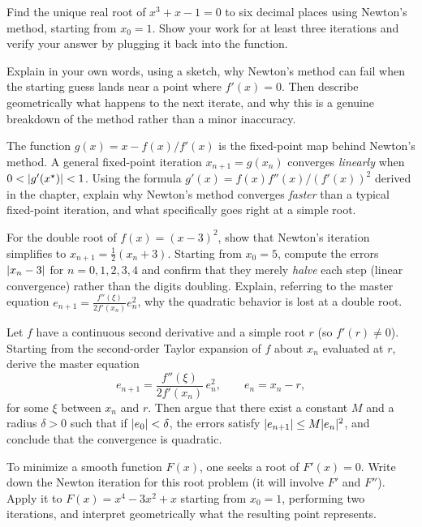 \begin{exercise}
Find the unique real root of $x^3 + x - 1 = 0$ to six decimal places using Newton's
method, starting from $x_0 = 1$. Show your work for at least three iterations and
verify your answer by plugging it back into the function.
\end{exercise}

\begin{exercise}[Conceptual]
Explain in your own words, using a sketch, why Newton's method can fail when the
starting guess lands near a point where $f'(x) = 0$. Then describe geometrically what
happens to the next iterate, and why this is a genuine breakdown of the method rather
than a minor inaccuracy.
\end{exercise}

\begin{exercise}[Conceptual]
The function $g(x) = x - f(x)/f'(x)$ is the fixed-point map behind Newton's method. A
general fixed-point iteration $x_{n+1} = g(x_n)$ converges \emph{linearly} when
$0 < \lvert g'(x^\star)\rvert < 1$. Using the formula $g'(x) = f(x)f''(x)/(f'(x))^2$ derived
in the chapter, explain why Newton's method converges \emph{faster} than a typical
fixed-point iteration, and what specifically goes right at a simple root.
\end{exercise}

\begin{exercise}
For the double root of $f(x) = (x - 3)^2$, show that Newton's iteration simplifies to
$x_{n+1} = \tfrac12(x_n + 3)$. Starting from $x_0 = 5$, compute the errors
$\lvert x_n - 3\rvert$ for $n = 0,1,2,3,4$ and confirm that they merely \emph{halve} each
step (linear convergence) rather than the digits doubling. Explain, referring to the
master equation $e_{n+1} = \tfrac{f''(\xi)}{2f'(x_n)} e_n^2$, why the quadratic
behavior is lost at a double root.
\end{exercise}

\begin{exercise}[Proof]
Let $f$ have a continuous second derivative and a simple root $r$ (so $f'(r) \ne 0$).
Starting from the second-order Taylor expansion of $f$ about $x_n$ evaluated at $r$,
derive the master equation
\[
  e_{n+1} = \frac{f''(\xi)}{2 f'(x_n)}\, e_n^2, \qquad e_n = x_n - r,
\]
for some $\xi$ between $x_n$ and $r$. Then argue that there exist a constant $M$ and a
radius $\delta > 0$ such that if $\lvert e_0\rvert < \delta$, the errors satisfy
$\lvert e_{n+1}\rvert \le M \lvert e_n\rvert^2$, and conclude that the convergence is quadratic.
\end{exercise}

\begin{exercise}[Application]
To minimize a smooth function $F(x)$, one seeks a root of $F'(x) = 0$. Write down the
Newton iteration for this root problem (it will involve $F'$ and $F''$). Apply it to
$F(x) = x^4 - 3x^2 + x$ starting from $x_0 = 1$, performing two iterations, and
interpret geometrically what the resulting point represents.
\end{exercise}
